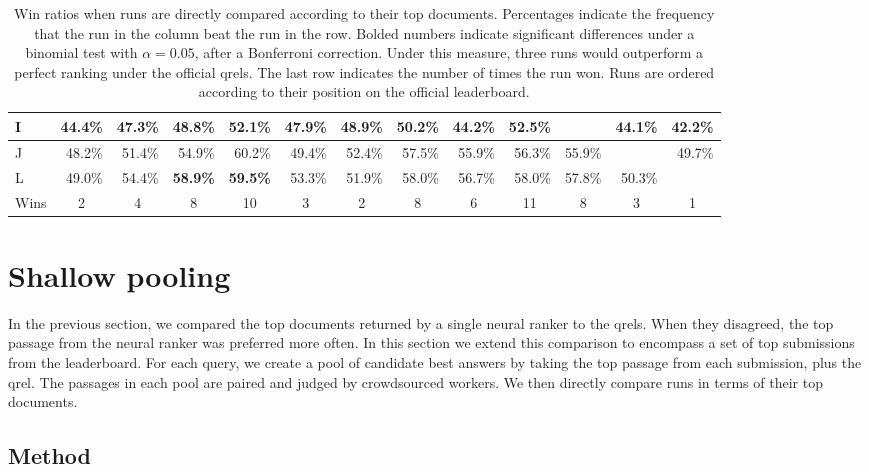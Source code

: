 \documentclass[fullpage]{article}
\begin{document}
{\begin{landscape}
\begin{table*}[]
\begin{center}
\begin{tabular}{|l|r|r|r|r|r|r|r|r|r|r|r|r|}
I & 44.4\% & 47.3\% & 48.8\% & 52.1\% & 47.9\% & 48.9\% & 50.2\% & 44.2\% & 52.5\% & \multicolumn{1}{l|}{} & 44.1\% & 42.2\% \\ \hline
J & 48.2\% & 51.4\% & 54.9\% & 60.2\% & 49.4\% & 52.4\% & 57.5\% & 55.9\% & 56.3\% & 55.9\% & \multicolumn{1}{l|}{} & 49.7\% \\ \hline
L & 49.0\% & 54.4\% & \textbf{58.9\%} & \textbf{59.5\%} & 53.3\% & 51.9\% & 58.0\% & 56.7\% & 58.0\% & 57.8\% & 50.3\% & \multicolumn{1}{l|}{} \\ \hline
\hline
Wins
& \multicolumn{1}{c|}{2} 
& \multicolumn{1}{c|}{4}
& \multicolumn{1}{c|}{8}
& \multicolumn{1}{c|}{10}
& \multicolumn{1}{c|}{3}
& \multicolumn{1}{c|}{2}
& \multicolumn{1}{c|}{8}
& \multicolumn{1}{c|}{6}
& \multicolumn{1}{c|}{11}
& \multicolumn{1}{c|}{8}
& \multicolumn{1}{c|}{3}
& \multicolumn{1}{c|}{1}
\\
\hline
\end{tabular}
\end{center}
\caption{Win ratios when runs are directly compared according to their top documents. Percentages indicate the frequency that the run in the column beat the run in the row. Bolded numbers indicate significant differences under a binomial test with $\alpha = 0.05$, after a Bonferroni correction. Under this measure, three runs would outperform a perfect ranking under the official qrels. The last row indicates the number of times the run won. Runs are ordered according to their position on the official leaderboard.}
\label{tab:win}
\end{table*}
\end{landscape}
\clearpage
}

\section{Shallow pooling}
\label{sec:pool}

In the previous section, we compared the top documents returned by a single neural ranker to the qrels. When they disagreed, the top passage from the neural ranker was preferred more often. In this section we extend this comparison to encompass a set of top submissions from the leaderboard. For each query, we create a pool of candidate best answers by taking the top passage from each submission, plus the qrel. The passages in each pool are paired and judged by crowdsourced workers. We then directly compare runs in terms of their top documents.

\subsection{Method}
\end{document}
